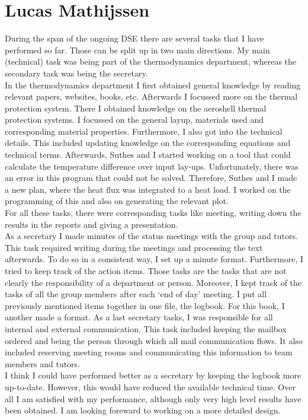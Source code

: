 \section{Lucas Mathijssen}
During the span of the ongoing DSE there are several tasks that I have performed so far. Those can be split up in two main directions. My main (technical) task was being part of the thermodynamics department, whereas the secondary task was being the secretary.\\
In the thermodynamics department I first obtained general knowledge by reading relevant papers, websites, books, etc. Afterwards I focussed more on the thermal protection system. There I obtained knowledge on the aeroshell thermal protection systems. I focussed on the general layup, materials used and corresponding material properties. Furthermore, I also got into the technical details. This included updating knowledge on the corresponding equations and technical terms. Afterwards, Suthes and I started working on a tool that could calculate the temperature difference over input lay-ups. Unfortunately, there was an error in this program that could not be solved. Therefore, Suthes and I made a new plan, where the heat flux was integrated to a heat load. I worked on the programming of this and also on generating the relevant plot. \\
For all these tasks, there were corresponding tasks like meeting, writing down the results in the reports and giving a presentation. \\
As a secretary I made minutes of the status meetings with the group and tutors. This task required writing during the meetings and processing the text afterwards. To do so in a consistent way, I set up a minute format. Furthermore, I tried to keep track of the action items. Those tasks are the tasks that are not clearly the responsibility of a department or person.  Moreover, I kept track of the tasks of all the group members after each ‘end of day’ meeting. I put all previously mentioned items together in one file, the logbook. For this book, I another made a format. As a last secretary tasks, I was responsible for all internal and external communication. This task included keeping the mailbox ordered and being the person through which all mail communication flows. It also included reserving meeting rooms and communicating this information to team members and tutors.\\
I think I could have performed better as a secretary by keeping the logbook more up-to-date. However, this would have reduced the available technical time. Over all I am satisfied with my performance, although only very high level results have been obtained. I am looking foreward to working on a more detailed design.\\
